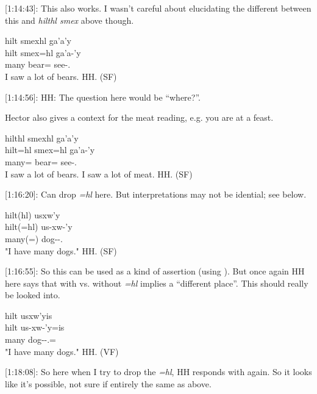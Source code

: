 [1:14:43]: This also works. I wasn't careful about elucidating the different between this and \textit{hilthl smex} above though.

\begin{exe}
    \ex \glll
    hilt smexhl ga'a'y  \\
    hilt smex=hl ga'a-'y \\
    many bear=\Cn{} see-\Fsg{}.\Ii{}  \\
    \glt I saw a lot of bears.  \hfill HH.\ElicitationDate{} (SF)
\end{exe}

[1:14:56]: HH: The question here would be ``where?''. 

Hector also gives a context for the meat reading, e.g. you are at a feast.

\begin{exe}
    \ex \glll
    hilthl smexhl ga'a'y  \\
    hilt=hl smex=hl ga'a-'y \\
    many=\Cn{} bear=\Cn{} see-\Fsg{}.\Ii{}  \\
    \glt \cmark I saw a lot of bears. \cmark I saw a lot of meat.  \hfill HH.\ElicitationDate{} (SF)
\end{exe}

[1:16:20]: Can drop \textit{=hl} here. But interpretations may not be idential; see below.

\begin{exe}
    \ex \glll
    hilt(hl) usxw'y \\
    hilt(=hl) us-xw-'y \\
    many(=\Cn{}) dog-\Val{}-\Fsg{}.\Ii{} \\
    \glt "I have many dogs." \hfill HH.\ElicitationDate{} (SF)
\end{exe}

[1:16:55]: So this can be used as a kind of assertion (using \Qudd{}). But once again HH here says that with vs. without \textit{=hl} implies a ``different place''. This should really be looked into.

\begin{exe}
    \ex \glll
    hilt usxw'yis \\
    hilt us-xw-'y=is \\
    many dog-\Val{}-\Fsg{}.\Ii{}=\Qudd{} \\
    \glt "I have many dogs." \hfill HH.\ElicitationDate{} (VF)
\end{exe}

[1:18:08]: So here when I try to drop the \textit{=hl}, HH responds with \Qudd{} again. So it looks like it's possible, not sure if entirely the same as above.


